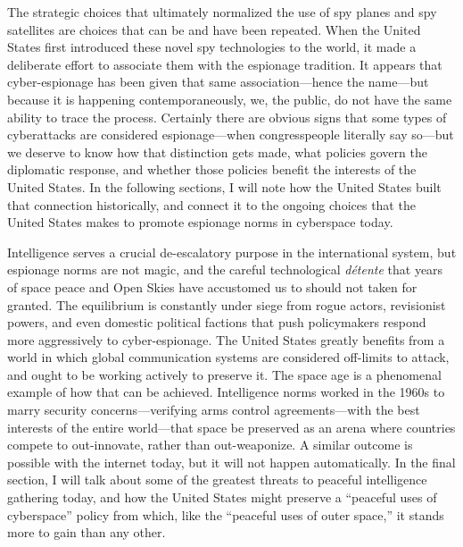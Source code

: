\documentclass{memoir}
\begin{document}
The strategic choices that ultimately normalized the use of spy planes and spy satellites are choices that can be and have been repeated. When the United States first introduced these novel spy technologies to the world, it made a deliberate effort to associate them with the espionage tradition. It appears that cyber-espionage has been given that same association---hence the name---but because it is happening contemporaneously, we, the public, do not have the same ability to trace the process. Certainly there are obvious signs that some types of cyberattacks are considered espionage---when congresspeople literally say so---but we deserve to know how that distinction gets made, what policies govern the diplomatic response, and whether those policies benefit the interests of the United States. In the following sections, I will note how the United States built that connection historically, and connect it to the ongoing choices that the United States makes to promote espionage norms in cyberspace today.

Intelligence serves a crucial de-escalatory purpose in the international system, but espionage norms are not magic, and the careful technological \emph{d\'etente} that years of space peace and Open Skies have accustomed us to should not taken for granted. The equilibrium is constantly under siege from rogue actors, revisionist powers, and even domestic political factions that push policymakers respond more aggressively to cyber-espionage. The United States greatly benefits from a world in which global communication systems are considered off-limits to attack, and ought to be working actively to preserve it. The space age is a phenomenal example of how that can be achieved. Intelligence norms worked in the 1960s to marry security concerns---verifying arms control agreements---with the best interests of the entire world---that space be preserved as an arena where countries compete to out-innovate, rather than out-weaponize. A similar outcome is possible with the internet today, but it will not happen automatically. In the final section, I will talk about some of the greatest threats to peaceful intelligence gathering today, and how the United States might preserve a ``peaceful uses of cyberspace'' policy from which, like the ``peaceful uses of outer space,'' it stands more to gain than any other.
\end{document}
